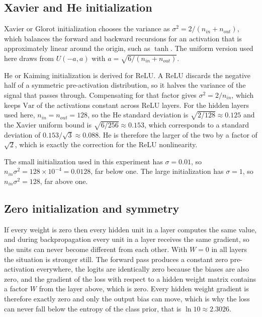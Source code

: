 \documentclass[12pt]{article}
\begin{document}
\subsection{Xavier and He initialization}

Xavier or Glorot initialization chooses the variance as $\sigma^2 = 2/(n_{in} + n_{out})$, which balances the forward and backward recursions for an activation that is approximately linear around the origin, such as $\tanh$. The uniform version used here draws from $U(-a, a)$ with $a = \sqrt{6/(n_{in}+n_{out})}$.

He or Kaiming initialization is derived for ReLU. A ReLU discards the negative half of a symmetric pre-activation distribution, so it halves the variance of the signal that passes through. Compensating for that factor gives $\sigma^2 = 2/n_{in}$, which keeps $\mathrm{Var}$ of the activations constant across ReLU layers. For the hidden layers used here, $n_{in} = n_{out} = 128$, so the He standard deviation is $\sqrt{2/128} \approx 0.125$ and the Xavier uniform bound is $\sqrt{6/256} \approx 0.153$, which corresponds to a standard deviation of $0.153/\sqrt{3} \approx 0.088$. He is therefore the larger of the two by a factor of $\sqrt{2}$, which is exactly the correction for the ReLU nonlinearity.

The small initialization used in this experiment has $\sigma = 0.01$, so $n_{in}\sigma^2 = 128 \times 10^{-4} = 0.0128$, far below one. The large initialization has $\sigma = 1$, so $n_{in}\sigma^2 = 128$, far above one.

\subsection{Zero initialization and symmetry}

If every weight is zero then every hidden unit in a layer computes the same value, and during backpropagation every unit in a layer receives the same gradient, so the units can never become different from each other. With $W = 0$ in all layers the situation is stronger still. The forward pass produces a constant zero pre-activation everywhere, the logits are identically zero because the biases are also zero, and the gradient of the loss with respect to a hidden weight matrix contains a factor $W$ from the layer above, which is zero. Every hidden weight gradient is therefore exactly zero and only the output bias can move, which is why the loss can never fall below the entropy of the class prior, that is $\ln 10 \approx 2.3026$.
\end{document}
